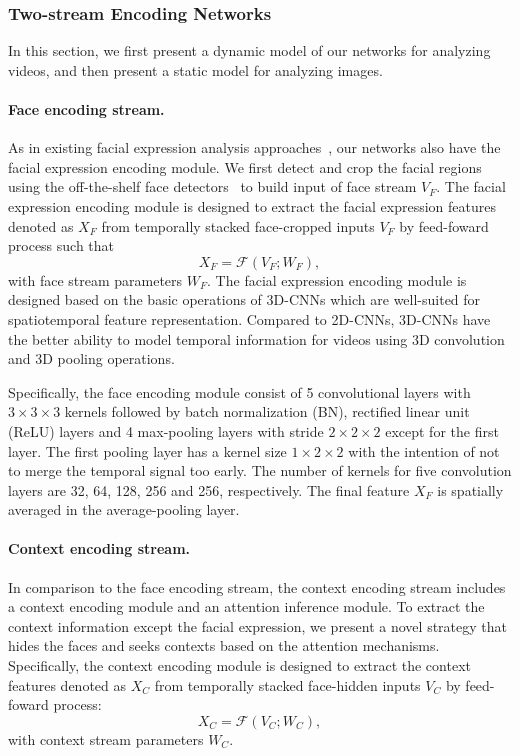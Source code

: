 \documentclass[10pt,twocolumn,letterpaper]{article}
\begin{document}
\subsubsection{Two-stream Encoding Networks}\vspace{-5pt}
In this section, we first present a dynamic model of our networks for analyzing videos, and then present a static model for analyzing images.\vspace{-10pt}

\paragraph{Face encoding stream.}
As in existing facial expression analysis approaches~\cite{fabian2016emotionet,lee2018spatiotemporal, fan2018video}, our networks also have the facial expression encoding module. We first detect and crop the facial regions using the off-the-shelf face detectors~\cite{king2009dlib} to build input of face stream $V_F$. The facial expression encoding module is designed to extract the facial expression features denoted as $X_F$ from temporally stacked face-cropped inputs $V_F$ by feed-foward process such that
\begin{equation}
X_F = \mathcal{F}(V_F; W_F),
\end{equation}
with face stream parameters $W_F$.
The facial expression encoding module is designed based on the basic operations of 3D-CNNs which are well-suited for spatiotemporal feature representation.
Compared to 2D-CNNs, 3D-CNNs have the better ability to model temporal information for videos using 3D convolution and 3D pooling operations.

Specifically, the face encoding module consist of 5 convolutional layers with $3 \times 3 \times 3$ kernels followed by batch normalization (BN), rectified linear unit (ReLU) layers and 4 max-pooling layers with stride $2 \times 2 \times 2$ except for the first layer.
The first pooling layer has a kernel size $1 \times 2 \times 2$ with the intention of not to merge the temporal signal too early.
The number of kernels for five convolution layers are 32, 64, 128, 256 and 256, respectively.
The final feature ${X}_F$ is spatially averaged in the average-pooling layer.\vspace{-10pt}



\paragraph{Context encoding stream.}
In comparison to the face encoding stream, the context encoding stream includes a context encoding module and an attention inference module.
To extract the context information except the facial expression, we present a novel strategy that hides the faces and seeks contexts based on the attention mechanisms.
Specifically, the context encoding module is designed to extract the context features denoted as $X_C$ from temporally stacked face-hidden inputs $V_C$ by feed-foward process:
\begin{equation}
X_C = \mathcal{F}(V_C; W_C),
\end{equation}
with context stream parameters $W_C$.
\end{document}
